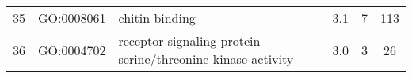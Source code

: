 \begin{tabular}{c|c|p{3in}|c|c|c}
35	&GO:0008061	&chitin binding	&3.1	&7	&113\\
36	&GO:0004702	&receptor signaling protein serine/threonine kinase activity	&3.0	&3	&26\\
\end{tabular}
